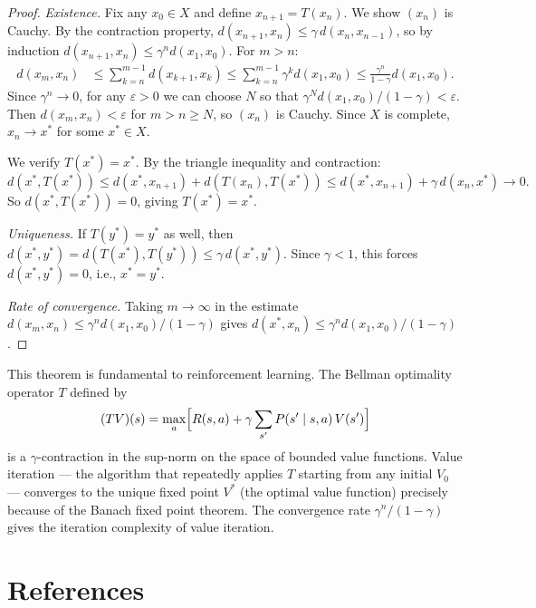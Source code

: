 \documentclass[11pt,a4paper]{article}
\theoremstyle{definition}
\theoremstyle{plain}
\theoremstyle{remark}
\begin{document}
\begin{proof}
\emph{Existence.}
Fix any $x_0 \in X$ and define $x_{n+1} = T(x_n)$. We show $(x_n)$ is Cauchy.
By the contraction property, $d(x_{n+1}, x_n) \le \gamma \, d(x_n, x_{n-1})$,
so by induction $d(x_{n+1}, x_n) \le \gamma^n d(x_1, x_0)$. For $m > n$:
\begin{align*}
d(x_m, x_n)
&\le \sum_{k=n}^{m-1} d(x_{k+1}, x_k)
\le \sum_{k=n}^{m-1} \gamma^k d(x_1, x_0)
\le \frac{\gamma^n}{1 - \gamma} d(x_1, x_0).
\end{align*}
Since $\gamma^n \to 0$, for any $\varepsilon > 0$ we can choose $N$ so that
$\gamma^N d(x_1, x_0)/(1 - \gamma) < \varepsilon$. Then $d(x_m, x_n) < \varepsilon$
for $m > n \ge N$, so $(x_n)$ is Cauchy. Since $X$ is complete, $x_n \to x^*$
for some $x^* \in X$.

We verify $T(x^*) = x^*$. By the triangle inequality and contraction:
\[
d(x^*, T(x^*)) \le d(x^*, x_{n+1}) + d(T(x_n), T(x^*))
\le d(x^*, x_{n+1}) + \gamma \, d(x_n, x^*) \to 0.
\]
So $d(x^*, T(x^*)) = 0$, giving $T(x^*) = x^*$.

\emph{Uniqueness.}
If $T(y^*) = y^*$ as well, then
$d(x^*, y^*) = d(T(x^*), T(y^*)) \le \gamma \, d(x^*, y^*)$.
Since $\gamma < 1$, this forces $d(x^*, y^*) = 0$, i.e., $x^* = y^*$.

\emph{Rate of convergence.}
Taking $m \to \infty$ in the estimate
$d(x_m, x_n) \le \gamma^n d(x_1, x_0)/(1 - \gamma)$ gives
$d(x^*, x_n) \le \gamma^n d(x_1, x_0)/(1 - \gamma)$.
\end{proof}

\begin{keyresult}
This theorem is fundamental to reinforcement learning. The Bellman optimality
operator $T$ defined by
\[
(TV)(s) = \max_a \Bigl[R(s,a) + \gamma \sum_{s'} P(s' \mid s, a)\, V(s')\Bigr]
\]
is a $\gamma$-contraction in the sup-norm on the space of bounded value functions.
Value iteration --- the algorithm that repeatedly applies $T$ starting from any
initial $V_0$ --- converges to the unique fixed point $V^*$ (the optimal value
function) precisely because of the Banach fixed point theorem. The convergence
rate $\gamma^n/(1-\gamma)$ gives the iteration complexity of value iteration.
\end{keyresult}

\section*{References}
\end{document}
